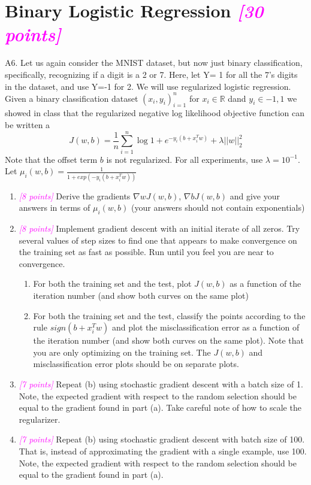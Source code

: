 \documentclass{article}
\newcommand{\field}[1]{\mathbb{#1}}
\newcommand{\1}{\mathbf{1}}
\newcommand{\R}{\field{R}} %
\newcommand{\points}[1]{\small\textcolor{magenta}{\emph{[#1 points]}} \normalsize}
\begin{document}
\section*{Binary Logistic Regression \points{30}}
A6. Let us again consider the MNIST dataset, but now just binary classification, specifically, recognizing if a digit is a 2 or 7. Here, let Y= 1 for all the 7’s digits in the dataset, and use Y=-1 for 2. We will use regularized logistic regression.  Given a binary classification dataset ${(x_i,y_i)}^n_{i=1}$ for $x_i\in\R$ dand $y_i\in {-1,1}$ we showed in class that the regularized negative log likelihood objective function can be written a
$$J(w,b) = \frac{1}{n} \sum_{i=1}^n \log{ 1 + e^{-y_i(b+x^T_iw)} } + \lambda||w||^2_2$$
Note that the offset term $b$ is not regularized. For all experiments, use $\lambda = 10^{-1}$. Let $\mu_i(w,b) = \frac{1}{1+exp(-y_i(b+x^T_iw))}$
\begin{enumerate}
    \item \points{8} Derive the gradients $\nabla wJ(w,b)$, $\nabla bJ(w,b)$ and give your answers in terms of $\mu_i(w,b)$  (your answers should not contain exponentials)
    \item \points{8} Implement gradient descent with an initial iterate of all zeros. Try several values of step sizes to find one that appears to make convergence on the training set as fast as possible. Run until you feel you are near to convergence.
    \begin{enumerate}
        \item For both the training set and the test, plot $J(w,b)$ as a function of the iteration number (and show both curves on the same plot)
        \item For both the training set and the test, classify the points according to the rule $sign(b+x^T_iw)$ and plot the misclassification error as a function of the iteration number (and show both curves on the same plot). Note that you are only optimizing on the training set. The $J(w,b)$ and misclassification error plots should be on separate plots.
    \end{enumerate}
    \item \points{7} Repeat (b) using stochastic gradient descent with a batch size of 1. Note, the expected gradient with respect to the random selection should be equal to the gradient found in part (a). Take careful note of how to scale the regularizer.
    \item \points{7} Repeat (b) using stochastic gradient descent with batch size of 100. That is, instead of approximating the gradient with a single example, use 100. Note, the expected gradient with respect to the random selection should be equal to the gradient found in part (a).
\end{enumerate}
\end{document}

